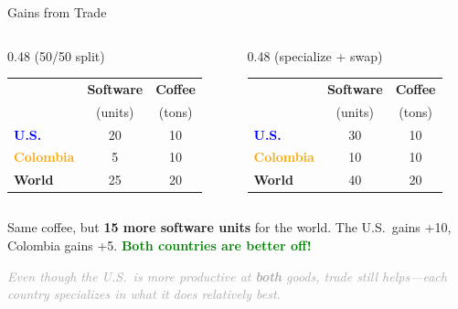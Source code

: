 \documentclass[9pt,english,aspectratio=169]{beamer}
\begin{document}
\begin{frame}{Gains from Trade}

  \begin{columns}[T]
    \begin{column}{0.48\textwidth}
       {\small (50/50 split)}

      \vspace{0.8em}
      \centering
      \begin{tabular}{@{} l c c @{}}
        \toprule
        & \textbf{Software} & \textbf{Coffee} \\
        & (units) & (tons) \\
        \midrule
        \textcolor{blue}{\textbf{U.S.}} & 20 & 10 \\
        \textcolor{orange}{\textbf{Colombia}} & 5 & 10 \\
        \midrule
        \textbf{World} & 25 & 20 \\
        \bottomrule
      \end{tabular}
    \end{column}
    \begin{column}{0.48\textwidth}
       {\small (specialize + swap)}

      \vspace{0.8em}
      \centering
      \begin{tabular}{@{} l c c @{}}
        \toprule
        & \textbf{Software} & \textbf{Coffee} \\
        & (units) & (tons) \\
        \midrule
        \textcolor{blue}{\textbf{U.S.}} & 30 & 10 \\
        \textcolor{orange}{\textbf{Colombia}} & 10 & 10 \\
        \midrule
        \textbf{World} & 40 & 20 \\
        \bottomrule
      \end{tabular}
    \end{column}
  \end{columns}

  \vspace{1.5em}
  \pause
  \begin{insightbox}
    Same coffee, but \textbf{15 more software units} for the world.
    The U.S.\ gains +10, Colombia gains +5. \textcolor{green}{\textbf{Both countries are better off!}}
  \end{insightbox}

  \vspace{0.8em}
  \textcolor{DarkGray}{\textit{Even though the U.S.\ is more productive at \textbf{both} goods, trade still
  helps---each country specializes in what it does \textit{relatively} best.}}

\end{frame}
\end{document}
